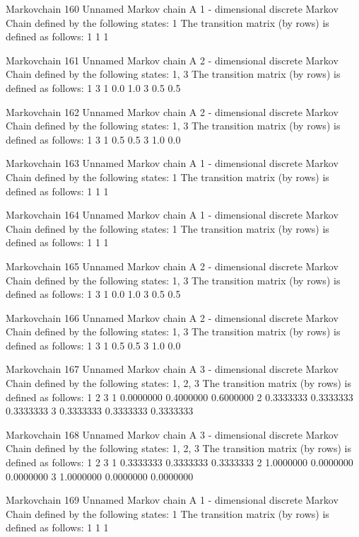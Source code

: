 \documentclass[
  nojss]{jss}
\begin{document}
\begin{CodeChunk}
\begin{CodeOutput}
Markovchain  160 
Unnamed Markov chain 
 A  1 - dimensional discrete Markov Chain defined by the following states: 
 1 
 The transition matrix  (by rows)  is defined as follows: 
  1
1 1

Markovchain  161 
Unnamed Markov chain 
 A  2 - dimensional discrete Markov Chain defined by the following states: 
 1, 3 
 The transition matrix  (by rows)  is defined as follows: 
    1   3
1 0.0 1.0
3 0.5 0.5

Markovchain  162 
Unnamed Markov chain 
 A  2 - dimensional discrete Markov Chain defined by the following states: 
 1, 3 
 The transition matrix  (by rows)  is defined as follows: 
    1   3
1 0.5 0.5
3 1.0 0.0

Markovchain  163 
Unnamed Markov chain 
 A  1 - dimensional discrete Markov Chain defined by the following states: 
 1 
 The transition matrix  (by rows)  is defined as follows: 
  1
1 1

Markovchain  164 
Unnamed Markov chain 
 A  1 - dimensional discrete Markov Chain defined by the following states: 
 1 
 The transition matrix  (by rows)  is defined as follows: 
  1
1 1

Markovchain  165 
Unnamed Markov chain 
 A  2 - dimensional discrete Markov Chain defined by the following states: 
 1, 3 
 The transition matrix  (by rows)  is defined as follows: 
    1   3
1 0.0 1.0
3 0.5 0.5

Markovchain  166 
Unnamed Markov chain 
 A  2 - dimensional discrete Markov Chain defined by the following states: 
 1, 3 
 The transition matrix  (by rows)  is defined as follows: 
    1   3
1 0.5 0.5
3 1.0 0.0

Markovchain  167 
Unnamed Markov chain 
 A  3 - dimensional discrete Markov Chain defined by the following states: 
 1, 2, 3 
 The transition matrix  (by rows)  is defined as follows: 
          1         2         3
1 0.0000000 0.4000000 0.6000000
2 0.3333333 0.3333333 0.3333333
3 0.3333333 0.3333333 0.3333333

Markovchain  168 
Unnamed Markov chain 
 A  3 - dimensional discrete Markov Chain defined by the following states: 
 1, 2, 3 
 The transition matrix  (by rows)  is defined as follows: 
          1         2         3
1 0.3333333 0.3333333 0.3333333
2 1.0000000 0.0000000 0.0000000
3 1.0000000 0.0000000 0.0000000

Markovchain  169 
Unnamed Markov chain 
 A  1 - dimensional discrete Markov Chain defined by the following states: 
 1 
 The transition matrix  (by rows)  is defined as follows: 
  1
1 1


\end{CodeOutput}
\end{CodeChunk}
\end{document}
